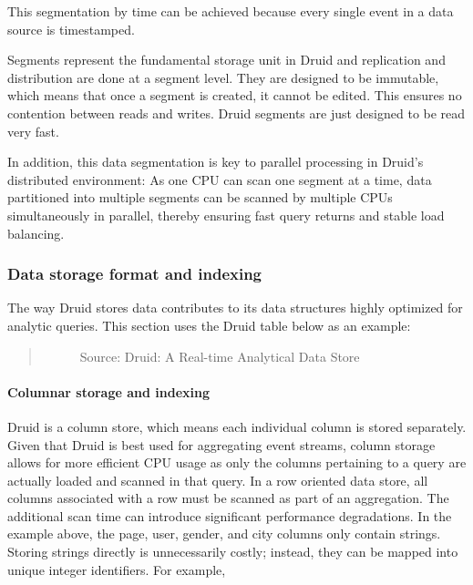 \documentclass[letterpaper,10pt,english]{sphinxmanual}
\begin{document}
This segmentation by time can be achieved because every single event in a data source is timestamped.

Segments represent the fundamental storage unit in Druid and replication and distribution are done at a segment level. They are designed to be immutable, which means that once a segment is created, it cannot be edited. This ensures no contention between reads and writes. Druid segments are just designed to be read very fast.

In addition, this data segmentation is key to parallel processing in Druid’s distributed environment: As one CPU can scan one segment at a time, data partitioned into multiple segments can be scanned by multiple CPUs simultaneously in parallel, thereby ensuring fast query returns and stable load balancing.


\subsubsection{Data storage format and indexing}
\label{\detokenize{discovery/part01/druid_features:id2}}
The way Druid stores data contributes to its data structures highly optimized for analytic queries. This section uses the Druid table below as an example:
\begin{quote}

\begin{figure}[H]
\centering
\capstart

\noindent{}
\caption{Source: Druid: A Real-time Analytical Data Store}\label{\detokenize{discovery/part01/druid_features:id8}}\end{figure}
\end{quote}


\paragraph{Columnar storage and indexing}
\label{\detokenize{discovery/part01/druid_features:id3}}
Druid is a column store, which means each individual column is stored separately. Given that Druid is best used for aggregating event streams, column storage allows for more efficient CPU usage as only the columns pertaining to a query are actually loaded and scanned in that query. In a row oriented data store, all columns associated with a row must be scanned as part of an aggregation. The additional scan time can introduce significant performance degradations. In the example above, the page, user, gender, and city columns only contain strings. Storing strings directly is unnecessarily costly; instead, they can be mapped into unique integer identifiers. For example,
\end{document}
